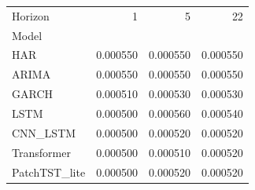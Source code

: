 \begin{tabular}{lrrr}
\toprule
Horizon & 1 & 5 & 22 \\
Model &  &  &  \\
\midrule
HAR & 0.000550 & 0.000550 & 0.000550 \\
ARIMA & 0.000550 & 0.000550 & 0.000550 \\
GARCH & 0.000510 & 0.000530 & 0.000530 \\
LSTM & 0.000500 & 0.000560 & 0.000540 \\
CNN_LSTM & 0.000500 & 0.000520 & 0.000520 \\
Transformer & 0.000500 & 0.000510 & 0.000520 \\
PatchTST_lite & 0.000500 & 0.000520 & 0.000520 \\
\bottomrule
\end{tabular}
